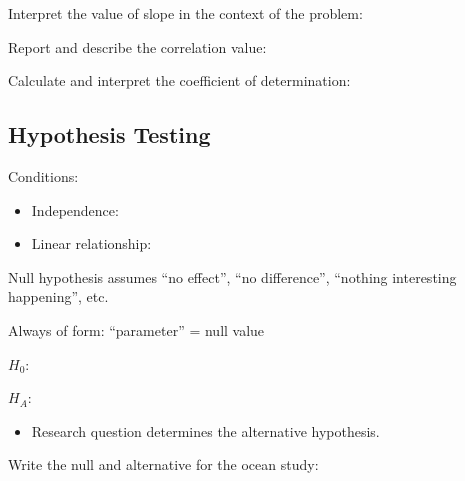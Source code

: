 \documentclass[
]{report}
\providecommand{\tightlist}{%
  \setlength{\itemsep}{0pt}\setlength{\parskip}{0pt}}
\newcommand{\rgi}{\hspace{24pt}}  %
\begin{document}
\vspace{0.5in}

Interpret the value of slope in the context of the problem:

\vspace{0.5in}

Report and describe the correlation value:

\vspace{0.5in}

Calculate and interpret the coefficient of determination:

\vspace{0.8in}

\hypertarget{hypothesis-testing-5}{%
\subsection*{Hypothesis Testing}\label{hypothesis-testing-5}}

Conditions:

\begin{itemize}
\tightlist
\item
  Independence:
\end{itemize}

\vspace{0.3in}

\begin{itemize}
\tightlist
\item
  Linear relationship:
\end{itemize}

\vspace{0.3in}

Null hypothesis assumes ``no effect'', ``no difference'', ``nothing interesting happening'', etc.

\rgi Always of form: ``parameter'' = null value

\(H_0:\)

\vspace{0.5in}

\(H_A:\)

\vspace{0.5in}

\begin{itemize}
\tightlist
\item
  Research question determines the alternative hypothesis.
\end{itemize}

Write the null and alternative for the ocean study:
\end{document}
